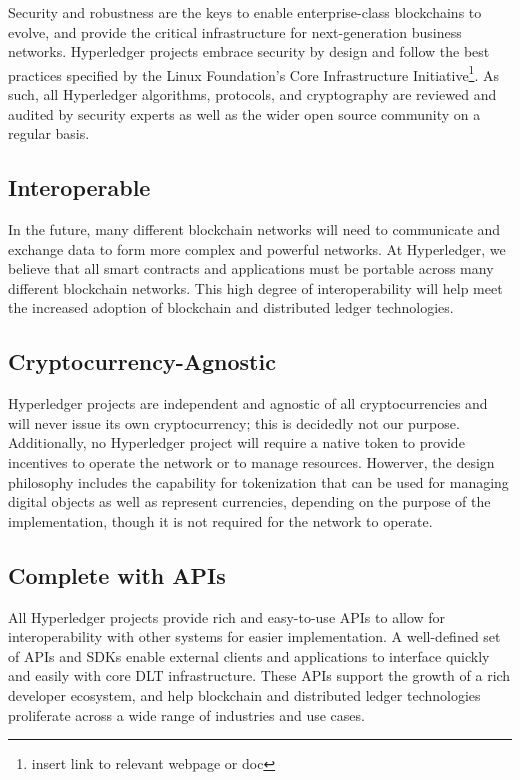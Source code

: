Security and robustness are the keys to enable enterprise-class blockchains to evolve, and provide the critical infrastructure for next-generation business networks. 
Hyperledger projects embrace security by design and follow the best practices specified by the Linux Foundation's Core Infrastructure Initiative\footnote{insert link to relevant webpage or doc}.
As such, all Hyperledger algorithms, protocols, and cryptography are reviewed and audited by security experts as well as the wider open source community on a regular basis.

\subsection{Interoperable} 
In the future, many different blockchain networks will need to communicate and exchange data to form more complex and powerful networks. 
At Hyperledger, we believe that all smart contracts and applications must be portable across many different blockchain networks. 
This high degree of interoperability will help meet the increased adoption of blockchain and distributed ledger technologies. 

\subsection{Cryptocurrency-Agnostic}
Hyperledger projects are independent and agnostic of all cryptocurrencies and will never issue its own cryptocurrency; this is decidedly not our purpose. 
Additionally, no Hyperledger project will require a native token to provide incentives to operate the network or to manage resources. 
Howerver, the design philosophy includes the capability for tokenization that can be used for managing digital objects as well as represent currencies, depending on the purpose of the implementation, though it is not required for the network to operate.

\subsection{Complete with APIs}
All Hyperledger projects provide rich and easy-to-use APIs to allow for interoperability with other systems for easier implementation. 
A well-defined set of APIs and SDKs enable external clients and applications to interface quickly and easily with core DLT infrastructure. 
These APIs support the growth of a rich developer ecosystem, and help blockchain and distributed ledger technologies proliferate across a wide range of industries and use cases.
